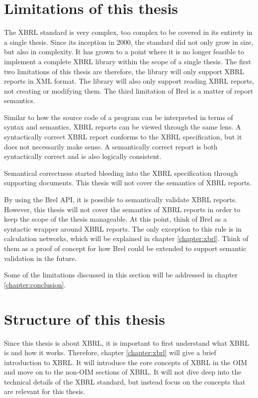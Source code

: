 \section{Limitations of this thesis}

The XBRL standard is very complex, too complex to be covered in its entirety in a single thesis.
Since its inception in 2000, the standard did not only grow in size, but also in complexity.
It has grown to a point where it is no longer feasible to implement a complete XBRL library within the scope of a single thesis.
The first two limitations of this thesis are therefore, the library will only support XBRL reports in XML format.
The library will also only support reading XBRL reports, not creating or modifying them.
The third limitation of Brel is a matter of report semantics.

Similar to how the source code of a program can be interpreted in terms of syntax and semantics, XBRL reports can be viewed through the same lens.
A syntactically correct XBRL report conforms to the XBRL specification, but it does not necessarily make sense.
A semantically correct report is both syntactically correct and is also logically consistent.

Semantical correctness started bleeding into the XBRL specification through supporting documents.
This thesis will not cover the semantics of XBRL reports.

By using the Brel API, it is possible to semantically validate XBRL reports.
However, this thesis will not cover the semantics of XBRL reports in order to keep the scope of the thesis manageable.
At this point, think of Brel as a syntactic wrapper around XBRL reports.
The only exception to this rule is in calculation networks, which will be explained in chapter \ref{chapter:xbrl}.
Think of them as a proof of concept for how Brel could be extended to support semantic validation in the future.

Some of the limitations discussed in this section will be addressed in chapter \ref{chapter:conclusion}.

\section{Structure of this thesis}

Since this thesis is about XBRL, it is important to first understand what XBRL is and how it works.
Therefore, chapter \ref{chapter:xbrl} will give a brief introduction to XBRL. 
It will introduce the core concepts of XBRL in the OIM and move on to the non-OIM sections of XBRL.
It will not dive deep into the technical details of the XBRL standard, but instead focus on the concepts that are relevant for this thesis.

